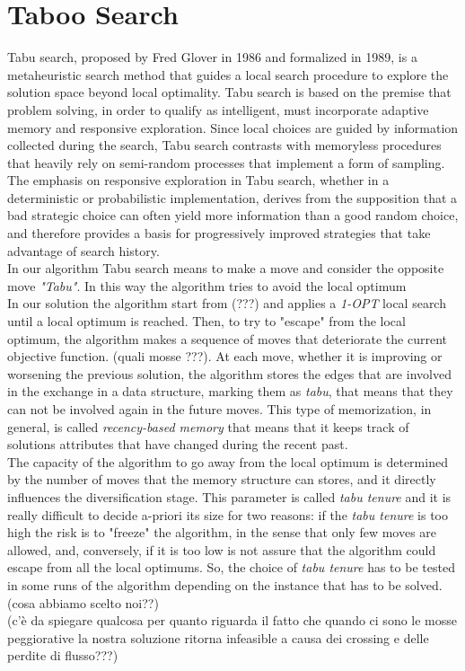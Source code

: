 \section{Taboo Search}
Tabu search, proposed by Fred Glover in 1986 and formalized in 1989, is a metaheuristic search method that guides a local search procedure to explore the solution space beyond local optimality. Tabu search is based on the premise that problem solving, in order to qualify as intelligent, must incorporate adaptive memory and responsive exploration. Since local choices are guided by information collected during the search, Tabu search contrasts with memoryless procedures that heavily rely on semi-random processes that implement a form of sampling. The emphasis on responsive exploration in Tabu search, whether in a deterministic or probabilistic implementation, derives from the supposition that a bad strategic choice can often yield more information than a good random choice, and therefore provides a basis for progressively improved strategies that take advantage of search history.\\
In our algorithm Tabu search means to make a move and consider the opposite move \textit{"Tabu"}. In this way the algorithm tries to avoid the local optimum\\
In our solution the algorithm start from (???) and applies a \textit{1-OPT} local search until a local optimum is reached. Then, to try to "escape" from the local optimum, the algorithm makes a sequence of moves that deteriorate the current objective function. (quali mosse ???). At each move, whether it is improving or worsening the previous solution, the algorithm stores the edges that are involved in the exchange in a data structure, marking them as \textit{tabu}, that means that they can not be involved again in the future moves. This type of memorization, in general, is called \textit{recency-based memory} that means that it keeps track of solutions attributes that have changed during the recent past.\\
The capacity of the algorithm to go away from the local optimum is determined by the number of moves that the memory structure can stores, and it directly influences the diversification stage. This parameter is called \textit{tabu tenure} and it is really difficult to decide a-priori its size for two reasons: if the \textit{tabu tenure} is too high the risk is to "freeze" the algorithm, in the sense that only few moves are allowed, and, conversely, if it is too low is not assure that the algorithm could escape from all
the local optimums. So, the choice of \textit{tabu tenure} has to be tested in some runs of the algorithm depending on the instance that has to be solved.(cosa abbiamo scelto noi??)\\
(c'è da spiegare qualcosa per quanto riguarda il fatto che quando ci sono le mosse peggiorative la nostra soluzione ritorna infeasible a causa dei crossing e delle perdite di flusso???)
